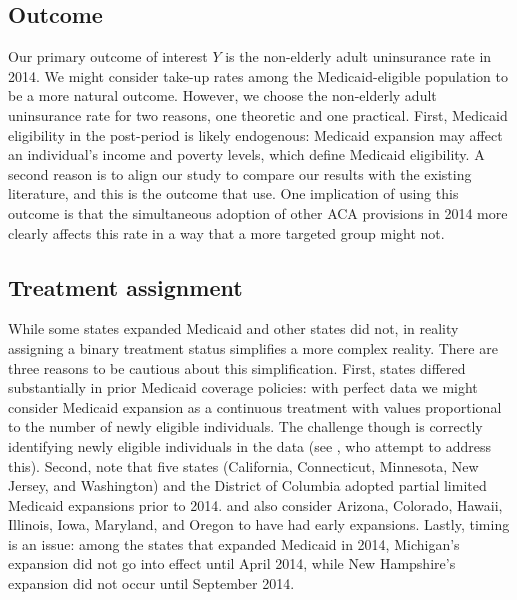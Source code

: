 \documentclass[12pt]{article}
\begin{document}
\subsection{Outcome}

Our primary outcome of interest $Y$ is the non-elderly adult uninsurance rate in 2014. We might consider take-up rates among the Medicaid-eligible population to be a more natural outcome. However, we choose the non-elderly adult uninsurance rate for two reasons, one theoretic and one practical. First, Medicaid eligibility in the post-period is likely endogenous: Medicaid expansion may affect an individual's income and poverty levels, which define Medicaid eligibility. A second reason is to align our study to compare our results with the existing literature, and this is the outcome that \cite{courtemanche2017early} use. One implication of using this outcome is that the simultaneous adoption of other ACA provisions in 2014 more clearly affects this rate in a way that a more targeted group might not.

\subsection{Treatment assignment} \label{sssec:txassign}

While some states expanded Medicaid and other states did not, in reality assigning a binary treatment status simplifies a more complex reality. There are three reasons to be cautious about this simplification. First, states differed substantially in prior Medicaid coverage policies: with perfect data we might consider Medicaid expansion as a continuous treatment with values proportional to the number of newly eligible individuals. The challenge though is correctly identifying newly eligible individuals in the data (see \cite{frean2017premium}, who attempt to address this). Second, \cite{frean2017premium} note that five states (California, Connecticut, Minnesota, New Jersey, and Washington) and the District of Columbia adopted partial limited Medicaid expansions prior to 2014. \cite{kaestner2017effects} and \cite{courtemanche2017early} also consider Arizona, Colorado, Hawaii, Illinois, Iowa, Maryland, and Oregon to have had early expansions. Lastly, timing is an issue: among the states that expanded Medicaid in 2014, Michigan's expansion did not go into effect until April 2014, while New Hampshire's expansion did not occur until September 2014.
\end{document}
